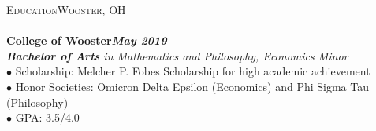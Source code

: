 \documentclass[a4paper]{article}
\newcommand{\lineunder} {
    \vspace*{-8pt} \\
    \hspace*{-18pt} \hrulefill \\
}
\newcommand{\header} [1] {
    {\hspace*{-18pt}\vspace*{6pt} \textsc{#1}}
    \vspace*{-6pt} \lineunder
}
\begin{document}
\header{Education\hfill Wooster, OH}
\hspace{-16pt}\textbf{College of Wooster}\hfill\textbf{\textit{May 2019}}\\
\hspace{-16pt}\textit{\textbf{Bachelor of Arts} in Mathematics and Philosophy, Economics Minor}\\
\hspace*{-12pt}$\bullet$ Scholarship: Melcher P. Fobes Scholarship for high academic achievement\\
\hspace*{-12pt}$\bullet$ Honor Societies: Omicron Delta Epsilon (Economics) and Phi Sigma Tau (Philosophy)\\
\hspace*{-12pt}$\bullet$ GPA: 3.5/4.0
\vspace*{2mm}
\end{document}
